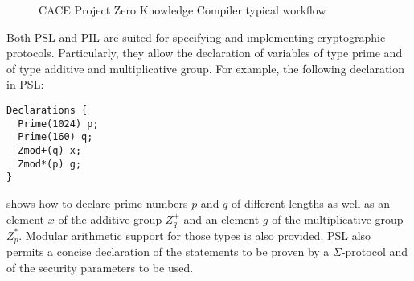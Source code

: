 \begin{figure}[hb!]
  \centering
  \caption{CACE Project Zero Knowledge Compiler typical workflow}
  \label{fig:cace_workflow}
\end{figure}

Both PSL and PIL are suited for specifying and implementing cryptographic protocols. Particularly, they allow the declaration of variables of type prime and of type additive and multiplicative group. For example, the following declaration in PSL:
\begin{lstlisting}[language=PSL]
Declarations {
  Prime(1024) p;
  Prime(160) q;
  Zmod+(q) x;
  Zmod*(p) g;
}
\end{lstlisting}
shows how to declare prime numbers $p$ and $q$ of different lengths as well as an element $x$ of the additive group $Z_q^+$ and an element $g$ of the multiplicative group $Z_p^*$. Modular arithmetic support for those types is also provided. PSL also permits a concise declaration of the statements to be proven by a $\Sigma$-protocol and of the security parameters to be used.


